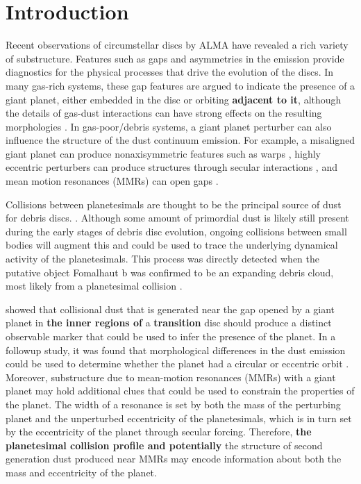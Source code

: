 \documentclass[fleqn,usenatbib]{mnras}
\begin{document}
\section{Introduction} \label{sec:intro}

Recent observations of circumstellar discs by ALMA have revealed a rich variety of substructure. Features such as gaps and asymmetries 
\citep{2015ApJ...808L...3A, 2016Sci...353.1519P, PhysRevLett.117.251101, 2016ApJ...820L..40A, 2016Natur.535..258C} in the emission provide 
diagnostics for the physical processes that drive the evolution of the discs. In many gas-rich systems, these gap features are argued to indicate the 
presence of a giant planet, either embedded in the disc \citep{2015MNRAS.453L..73D} or orbiting \textbf{adjacent to it}, although the details of gas-dust 
interactions can have strong effects on the resulting morphologies
\citep{2018ApJ...866..110D}. In gas-poor/debris systems, a giant
planet perturber can also influence 
the structure of the dust continuum emission. For example, a misaligned giant planet can produce nonaxisymmetric features such as warps 
\citep{2001A&A...370..447A}, highly eccentric perturbers can produce structures through secular interactions 
\citep{2014MNRAS.443.2541P, 2015MNRAS.448.3679P}, and mean motion resonances (MMRs) can open gaps
\citep{2015ApJ...798...83N, 2016ApJ...818..159T, 2018ApJ...857....3T}.

Collisions between planetesimals are thought to be the principal source of dust for debris discs. \citep[see][]{2008ARA&A..46..339W}.  Although some 
amount of primordial dust is likely still present during the early stages of debris disc evolution, ongoing collisions between small bodies will augment 
this and could be used to trace the underlying dynamical activity of the planetesimals. This process was directly detected when the putative object 
Fomalhaut b was confirmed to be an expanding debris cloud, most likely from a planetesimal collision \citep{2020PNAS..117.9712G}. 

\citet{2013ApJ...777L..31D} showed that collisional dust that is generated near the gap opened by a giant planet in \textbf{the inner regions of} a \textbf{transition} disc should 
produce a distinct observable marker that could be used to infer the presence of the planet. In a followup study, it was found that morphological 
differences in the dust emission could be used to determine whether the planet had a circular or eccentric orbit \citep{2016ApJ...820...29D}. Moreover, 
substructure due to mean-motion resonances (MMRs) with a giant planet may hold additional clues that could be used to constrain the properties of 
the planet.  The width of a resonance is set by both the mass of the perturbing planet and the unperturbed eccentricity of the planetesimals, 
which is in turn set by the eccentricity of the planet through secular forcing. Therefore, \textbf{the planetesimal collision profile and potentially} the structure of second generation dust produced near MMRs 
may encode information about both the mass and eccentricity of the planet.
\end{document}
